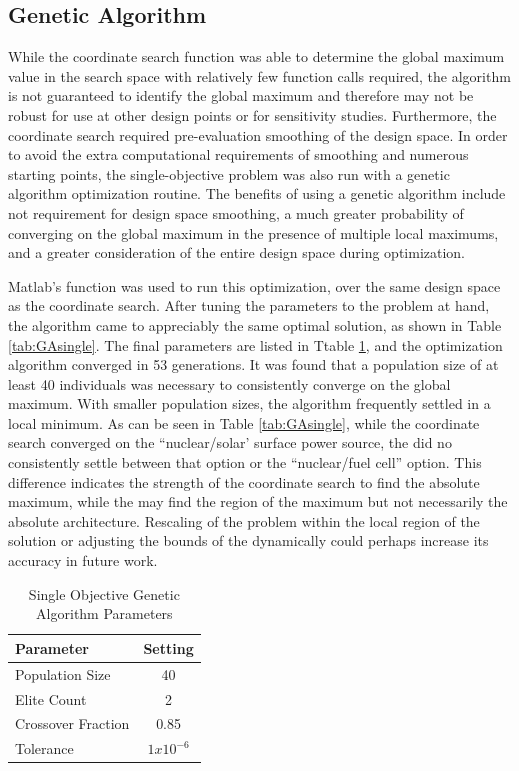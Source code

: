 \documentclass[]{aiaa-pretty}
\begin{document}
\subsection{Genetic Algorithm}
\label{sec:gasingle}

While the coordinate search function was able to determine the global maximum value in the search space with relatively few function calls required, the algorithm is not guaranteed to identify the global maximum and therefore may not be robust for use at other design points or for sensitivity studies. Furthermore, the coordinate search required pre-evaluation smoothing of the design space. In order to avoid the extra computational requirements of smoothing and numerous starting points, the single-objective problem was also run with a genetic algorithm optimization routine. The benefits of using a genetic algorithm include not requirement for design space smoothing, a much greater probability of converging on the global maximum in the presence of multiple local maximums, and a greater consideration of the entire design space during optimization.

Matlab's  function was used to run this optimization, over the same design space as the coordinate search. After tuning the  parameters to the problem at hand, the algorithm came to appreciably the same optimal solution, as shown in Table \ref{tab:GAsingle}. The final  parameters are listed in Ttable \ref{tab:gasingleparams}, and the optimization algorithm converged in 53 generations. It was found that a population size of at least 40 individuals was necessary to consistently converge on the global maximum. With smaller population sizes, the algorithm frequently settled in a local minimum. As can be seen in Table \ref{tab:GAsingle}, while the coordinate search converged on the ``nuclear/solar' surface power source, the  did no consistently settle between that option or the ``nuclear/fuel cell'' option. This difference indicates the strength of the coordinate search to find the absolute maximum, while the  may find the region of the maximum but not necessarily the absolute architecture. Rescaling of the problem within the local region of the solution or adjusting the bounds of the  dynamically could perhaps increase its accuracy in future work.


\begin{table}[h]
	\centering
	\caption{Single Objective Genetic Algorithm Parameters}
	\label{tab:gasingleparams}
	\begin{tabular}{lc}
		\textbf{Parameter} & \textbf{Setting} \\ \hline
		Population Size & 40\\
		Elite Count & 2\\
		Crossover Fraction & 0.85\\
		Tolerance & $1x10^{-6}$\\
	\end{tabular}
	\end{table}
\end{document}
